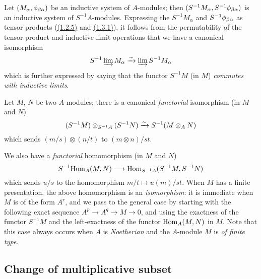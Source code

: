 \begin{env}[1.3.3]
\label{env-0.1.3.3}
Let $(M_\alpha,\phi_{\beta\alpha})$ be an inductive system of $A$-modules; then
$(S^{-1}M_\alpha,S^{-1}\phi_{\beta\alpha})$ is an inductive system of
$S^{-1}A$-modules. Expressing the $S^{-1}M_\alpha$ and
$S^{-1}\phi_{\beta\alpha}$ as tensor products (\hyperref[env-0.1.2.5]{(1.2.5)} and
\hyperref[env-0.1.3.1]{(1.3.1)}), it follows from the permutability of the tensor product and
inductive limit operations that we have a canonical isomorphism
\[
  S^{-1}\varinjlim M_\alpha\xrightarrow{\sim}\varinjlim S^{-1}M_\alpha
\]
which is further expressed by saying that the functor $S^{-1}M$ (in $M$)
{\em commutes with inductive limits}.
\end{env}

\begin{env}[1.3.4]
\label{env-0.1.3.4}
Let $M$, $N$ be two $A$-modules; there is a canonical {\em functorial}
isomorphism (in $M$ and $N$)
\[
  (S^{-1}M)\otimes_{S^{-1}A}(S^{-1}N)\xrightarrow{\sim} S^{-1}(M\otimes_A N)
\]
which sends $(m/s)\otimes(n/t)$ to $(m\otimes n)/st$.
\end{env}

\begin{env}[1.3.5]
\label{env-0.1.3.5}
We also have a {\em functorial} homomorphism (in $M$ and $N$)
\[
  S^{-1}{\mathop{\mathrm{Hom}}\nolimits}_A(M,N)\longrightarrow{\mathop{\mathrm{Hom}}\nolimits}_{S^{-1}A}(S^{-1}M,S^{-1}N)
\]
which sends $u/s$ to the homomorphism $m/t\mapsto u(m)/st$. When $M$ has a
finite presentation, the above homomorphism is an {\em isomorphism}: it is
immediate when $M$ is of the form $A^r$, and we pass to the general case by
starting with the following exact sequence $A^p\to A^q\to M\to 0$, and using the
exactness of the functor $S^{-1}M$ and the left-exactness of the functor
${\mathop{\mathrm{Hom}}\nolimits}_A(M,N)$ in $M$. Note that this case always occurs when $A$ is
{\em Noetherian} and the $A$-module $M$ is {\em of finite type}.
\end{env}

\subsection{Change of multiplicative subset}
\label{subsection-change-of-mult-subset}

